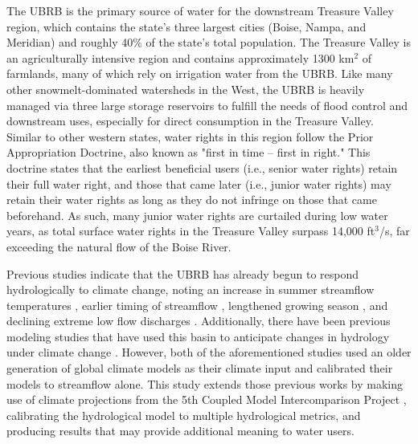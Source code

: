 \documentclass[11pt,letterpaper]{article}
\begin{document}
The UBRB is the primary source of water for the downstream Treasure Valley region, which contains the state's three largest cities (Boise, Nampa, and Meridian) and roughly 40\% of the state's total population. The Treasure Valley is an agriculturally intensive region and contains approximately 1300 km${}^2$ of farmlands, many of which rely on irrigation water from the UBRB.  Like many other snowmelt-dominated watersheds in the West, the UBRB is heavily managed via three large storage reservoirs to fulfill the needs of flood control and downstream uses, especially for direct consumption in the Treasure Valley. Similar to other western states, water rights in this region follow the Prior Appropriation Doctrine, also known as "first in time – first in right." This doctrine states that the earliest beneficial users (i.e., senior water rights) retain their full water right, and those that came later (i.e., junior water rights) may retain their water rights as long as they do not infringe on those that came beforehand. As such, many junior water rights are curtailed during low water years, as total surface water rights in the Treasure Valley surpass 14,000 ft${}^3$/s, far exceeding the natural flow of the Boise River.

Previous studies indicate that the UBRB has already begun to respond hydrologically to climate change, noting an increase in summer streamflow temperatures \citep{Isaak:2010fn}, earlier timing of streamflow \citep{Clark:2010bq}, lengthened growing season \citep{Kunkel:2004bh}, and declining extreme low flow discharges \citep{Kormos:2016hy}. Additionally, there have been previous modeling studies that have used this basin to anticipate changes in hydrology under climate change \citep{Stillwater:2008uf,Jin:2011ii}. However, both of the aforementioned studies used an older generation of global climate models as their climate input and calibrated their models to streamflow alone. This study extends those previous works by making use of climate projections from the 5th Coupled Model Intercomparison Project \citep[CMIP5,][]{Taylor:2012jga}, calibrating the hydrological model to multiple hydrological metrics, and producing results that may provide additional meaning to water users.
\end{document}
